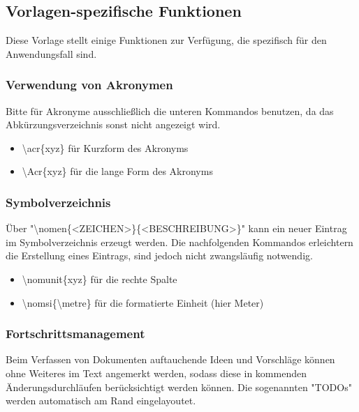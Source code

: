 \subsection{Vorlagen-spezifische Funktionen}

Diese Vorlage stellt einige Funktionen zur Verfügung, die spezifisch für den Anwendungsfall sind.


\subsubsection{Verwendung von Akronymen}

Bitte für Akronyme ausschließlich die unteren Kommandos benutzen, da das Abkürzungsverzeichnis
sonst nicht angezeigt wird.

\begin{itemize}
  \item \textbackslash{}acr\{xyz\} für Kurzform des Akronyms
  \item \textbackslash{}Acr\{xyz\} für die lange Form des Akronyms
\end{itemize}

\subsubsection{Symbolverzeichnis}

Über "\textbackslash{}nomen\{<ZEICHEN>\}\{<BESCHREIBUNG>\}" kann ein neuer Eintrag im
Symbolverzeichnis erzeugt werden. Die nachfolgenden Kommandos erleichtern die Erstellung
eines Eintrags, sind jedoch nicht zwangsläufig notwendig.

\begin{itemize}
  \item \textbackslash{}nomunit\{xyz\} für die rechte Spalte
  \item \textbackslash{}nomsi\{\textbackslash{}metre\} für die formatierte Einheit (hier Meter)
\end{itemize}

\subsubsection{Fortschrittsmanagement}

Beim Verfassen von Dokumenten auftauchende Ideen und Vorschläge können ohne Weiteres
im Text angemerkt werden, sodass diese in kommenden Änderungsdurchläufen berücksichtigt werden können.
Die sogenannten "TODOs" werden automatisch am Rand eingelayoutet.

